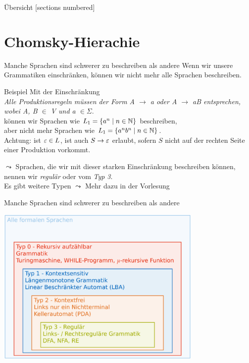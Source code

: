 \documentclass[10pt]{beamer}
\begin{document}
\maketitle

\begin{frame}[fragile]{Übersicht}
  [sections numbered]
  \tableofcontents%
\end{frame}


\section{Chomsky-Hierachie}

\begin{frame}[fragile]{Manche Sprachen sind schwerer zu beschreiben als andere}
    Wenn wir unsere Grammatiken einschränken, können wir nicht mehr alle Sprachen beschreiben.
    \begin{exampleblock}{Beispiel}
        Mit der Einschränkung\\
        \emph{Alle Produktionsregeln müssen der Form \alert{A $\to$ a oder A $\to$ aB} entsprechen, wobei A, B $\in$ V und a $\in \Sigma$}.\\
        können wir Sprachen wie $L_1 = \{a^n \mid n \in \mathbb{N}\}$ beschreiben,\\ aber nicht mehr Sprachen wie $L_1 = \{a^nb^n \mid n \in \mathbb{N}\}$.\\
        \alert{Achtung:} ist $\varepsilon \in L$, ist auch $S\to\varepsilon$ erlaubt, sofern $S$ nicht auf der rechten Seite einer Produktion vorkommt.
    \end{exampleblock}
    $\leadsto$ Sprachen, die wir mit dieser starken Einschränkung beschreiben können, nennen wir \alert{\emph{regulär}} oder vom \alert{\emph{Typ 3}}.\\
    Es gibt weitere Typen $\leadsto$ Mehr dazu in der Vorlesung
\end{frame}

\begin{frame}[fragile]{Manche Sprachen sind schwerer zu beschreiben als andere}
    \begin{center}
        \includegraphics[width=0.75\textwidth]{Chomsky}
    \end{center}
\end{frame}
\end{document}

